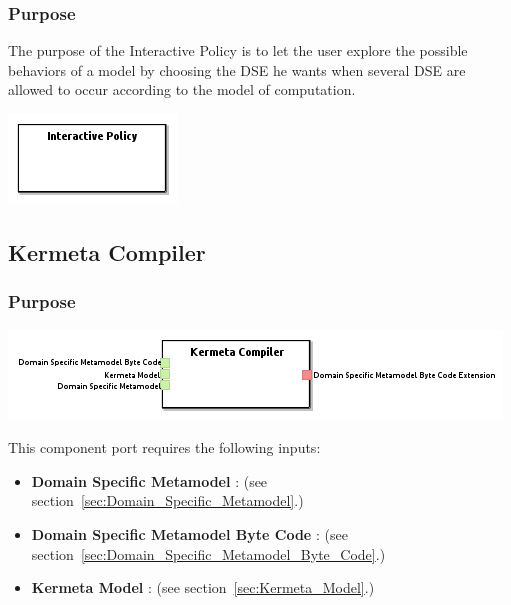 \documentclass{gemoc} %
\begin{document}
\subsubsection{Purpose}
The purpose of the Interactive Policy is to let the user explore the possible behaviors of a model by choosing the DSE he wants when several DSE are allowed to occur according to the model of computation.

\begin{center}
\includegraphics*[trim=0.0cm 0.0cm 0cm 0.0cm, clip=true]{../images/generated/Generated_Interactive_Policy.png}
\end{center}




\subsection{Kermeta Compiler}
\label{sec:Kermeta_Compiler}


\subsubsection{Purpose}


\begin{center}
\includegraphics*[trim=0.0cm 0.0cm 0cm 0.0cm, clip=true]{../images/generated/Generated_Kermeta_Compiler.png}
\end{center}

This component port requires the following inputs:
\begin{itemize}
  \item \textbf{Domain Specific Metamodel} :
(see section~\ref{sec:Domain_Specific_Metamodel}.)
  \item \textbf{Domain Specific Metamodel Byte Code} :
(see section~\ref{sec:Domain_Specific_Metamodel_Byte_Code}.)
  \item \textbf{Kermeta Model} :
(see section~\ref{sec:Kermeta_Model}.)
\end{itemize}
\end{document}
